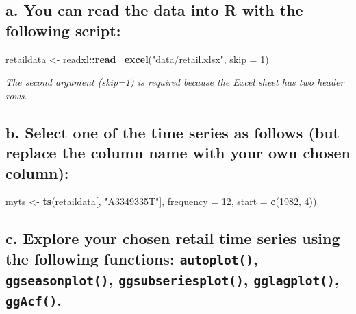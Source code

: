 \documentclass[openany]{book}
\newenvironment{Shaded}{\begin{snugshade}}{\end{snugshade}}
\newcommand{\DataTypeTok}[1]{\textcolor[rgb]{0.13,0.29,0.53}{#1}}
\newcommand{\DecValTok}[1]{\textcolor[rgb]{0.00,0.00,0.81}{#1}}
\newcommand{\KeywordTok}[1]{\textcolor[rgb]{0.13,0.29,0.53}{\textbf{#1}}}
\newcommand{\NormalTok}[1]{#1}
\newcommand{\OperatorTok}[1]{\textcolor[rgb]{0.81,0.36,0.00}{\textbf{#1}}}
\newcommand{\StringTok}[1]{\textcolor[rgb]{0.31,0.60,0.02}{#1}}
\begin{document}
\hypertarget{a.-you-can-read-the-data-into-r-with-the-following-script}{%
\subsection{a. You can read the data into R with the following script:}\label{a.-you-can-read-the-data-into-r-with-the-following-script}}

\begin{Shaded}
\begin{Highlighting}[]
\NormalTok{retaildata <-}\StringTok{ }\NormalTok{readxl}\OperatorTok{::}\KeywordTok{read_excel}\NormalTok{(}\StringTok{"data/retail.xlsx"}\NormalTok{, }\DataTypeTok{skip =} \DecValTok{1}\NormalTok{)}
\end{Highlighting}
\end{Shaded}

\emph{The second argument (skip=1) is required because the Excel sheet has two header rows.}

\hypertarget{b.-select-one-of-the-time-series-as-follows-but-replace-the-column-name-with-your-own-chosen-column}{%
\subsection{b. Select one of the time series as follows (but replace the column name with your own chosen column):}\label{b.-select-one-of-the-time-series-as-follows-but-replace-the-column-name-with-your-own-chosen-column}}

\begin{Shaded}
\begin{Highlighting}[]
\NormalTok{myts <-}\StringTok{ }\KeywordTok{ts}\NormalTok{(retaildata[, }\StringTok{"A3349335T"}\NormalTok{], }\DataTypeTok{frequency =} \DecValTok{12}\NormalTok{, }\DataTypeTok{start =} \KeywordTok{c}\NormalTok{(}\DecValTok{1982}\NormalTok{, }
  \DecValTok{4}\NormalTok{))}
\end{Highlighting}
\end{Shaded}

\hypertarget{c.-explore-your-chosen-retail-time-series-using-the-following-functions-autoplot-ggseasonplot-ggsubseriesplot-gglagplot-ggacf.}{%
\subsection{\texorpdfstring{c. Explore your chosen retail time series using the following functions: \texttt{autoplot()}, \texttt{ggseasonplot()}, \texttt{ggsubseriesplot()}, \texttt{gglagplot()}, \texttt{ggAcf()}.}{c. Explore your chosen retail time series using the following functions: autoplot(), ggseasonplot(), ggsubseriesplot(), gglagplot(), ggAcf().}}\label{c.-explore-your-chosen-retail-time-series-using-the-following-functions-autoplot-ggseasonplot-ggsubseriesplot-gglagplot-ggacf.}}
\end{document}
